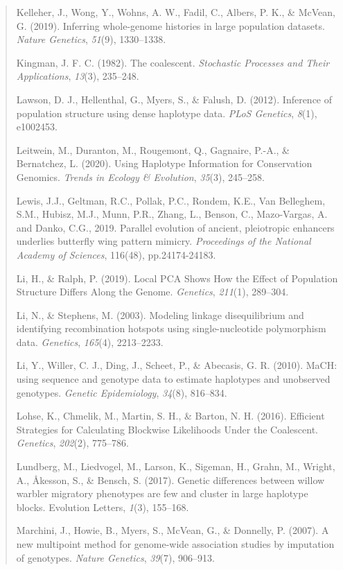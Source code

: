\documentclass[
]{article}
\begin{document}
\begin{quote}
Kelleher, J., Wong, Y., Wohns, A. W., Fadil, C., Albers, P. K., \&
McVean, G. (2019). Inferring whole-genome histories in large population
datasets. \emph{Nature Genetics}, \emph{51}(9), 1330--1338.

Kingman, J. F. C. (1982). The coalescent. \emph{Stochastic Processes and
Their Applications}, \emph{13}(3), 235--248.

Lawson, D. J., Hellenthal, G., Myers, S., \& Falush, D. (2012).
Inference of population structure using dense haplotype data. \emph{PLoS
Genetics}, \emph{8}(1), e1002453.

Leitwein, M., Duranton, M., Rougemont, Q., Gagnaire, P.-A., \&
Bernatchez, L. (2020). Using Haplotype Information for Conservation
Genomics. \emph{Trends in Ecology \& Evolution}, \emph{35}(3), 245--258.

Lewis, J.J., Geltman, R.C., Pollak, P.C., Rondem, K.E., Van Belleghem,
S.M., Hubisz, M.J., Munn, P.R., Zhang, L., Benson, C., Mazo-Vargas, A.
and Danko, C.G., 2019. Parallel evolution of ancient, pleiotropic
enhancers underlies butterfly wing pattern mimicry. \emph{Proceedings of
the National Academy of Sciences}, 116(48), pp.24174-24183.

Li, H., \& Ralph, P. (2019). Local PCA Shows How the Effect of
Population Structure Differs Along the Genome. \emph{Genetics},
\emph{211}(1), 289--304.

Li, N., \& Stephens, M. (2003). Modeling linkage disequilibrium and
identifying recombination hotspots using single-nucleotide polymorphism
data. \emph{Genetics}, \emph{165}(4), 2213--2233.

Li, Y., Willer, C. J., Ding, J., Scheet, P., \& Abecasis, G. R. (2010).
MaCH: using sequence and genotype data to estimate haplotypes and
unobserved genotypes. \emph{Genetic Epidemiology}, \emph{34}(8),
816--834.

Lohse, K., Chmelik, M., Martin, S. H., \& Barton, N. H. (2016).
Efficient Strategies for Calculating Blockwise Likelihoods Under the
Coalescent. \emph{Genetics}, \emph{202}(2), 775--786.

Lundberg, M., Liedvogel, M., Larson, K., Sigeman, H., Grahn, M., Wright,
A., Åkesson, S., \& Bensch, S. (2017). Genetic differences between
willow warbler migratory phenotypes are few and cluster in large
haplotype blocks. Evolution Letters, \emph{1}(3), 155--168.

Marchini, J., Howie, B., Myers, S., McVean, G., \& Donnelly, P. (2007).
A new multipoint method for genome-wide association studies by
imputation of genotypes. \emph{Nature Genetics}, \emph{39}(7), 906--913.


\end{quote}
\end{document}
